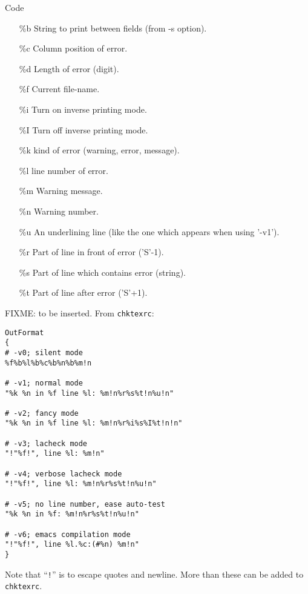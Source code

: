 Code
%
\begin{itemize}
\item[\%b]
String to print between fields (from -s option).
\item[\%c]
Column position of error.
\item[\%d]
Length of error (digit).
\item[\%f]
Current file-name.
\item[\%i]
Turn on inverse printing mode.
\item[\%I]
Turn off inverse printing mode.
\item[\%k]
kind of error (warning, error, message).
\item[\%l]
line number of error.
\item[\%m]
Warning message.
\item[\%n]
Warning number.
\item[\%u]
An underlining line (like the one which appears when using '-v1').
\item[\%r]
Part of line in front of error ('S'-1).
\item[\%s]
Part of line which contains error (string).
\item[\%t]
Part of line after error ('S'+1).
\end{itemize}



FIXME\@: to be inserted. 
From \texttt{chktexrc}: 
\begin{verbatim}
OutFormat
{
# -v0; silent mode
%f%b%l%b%c%b%n%b%m!n

# -v1; normal mode
"%k %n in %f line %l: %m!n%r%s%t!n%u!n"

# -v2; fancy mode
"%k %n in %f line %l: %m!n%r%i%s%I%t!n!n"

# -v3; lacheck mode
"!"%f!", line %l: %m!n"

# -v4; verbose lacheck mode
"!"%f!", line %l: %m!n%r%s%t!n%u!n"

# -v5; no line number, ease auto-test
"%k %n in %f: %m!n%r%s%t!n%u!n"

# -v6; emacs compilation mode
"!"%f!", line %l.%c:(#%n) %m!n"
}
\end{verbatim}

Note that ``\texttt!'' is to escape quotes and newline. 
More than these can be added to \texttt{chktexrc}. 


